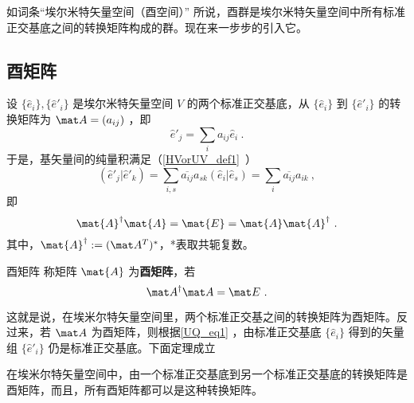 
如词条“埃尔米特矢量空间（酉空间）” 所说，酉群是埃尔米特矢量空间中所有标准正交基底之间的转换矩阵构成的群。现在来一步步的引入它。
\subsection{酉矩阵}
设 $\{ \hat e_i\},\{  \hat e'_i\}$ 是埃尔米特矢量空间 $V$ 的两个标准正交基底，从 $\{ \hat e_i\}$ 到 $\{\hat e'_i\}$ 的转换矩阵为 $\mat A=(a_{ij})$ ，即
\begin{equation}\label{UQ_eq1}
   \hat e'_j=\sum_{i}a_{ij} \hat e_i~.
\end{equation}
于是，基矢量间的纯量积满足（\autoref{HVorUV_def1}~）
\begin{equation}
( \hat e'_j| \hat e'_k)=\sum_{i,s}\overline{a_{ij}}a_{sk}(\hat e_i|\hat e_s)=\sum_{i}\overline{a_{ij}}a_{ik}~,
\end{equation}
即
\begin{equation}\label{UQ_eq2}
\mat{A}^\dagger \mat{A}=\mat{E}=\mat{A} \mat{A}^\dagger~.
\end{equation}
其中，$\mat{A}^\dagger:=(\mat A^T)^*$，*表取共轭复数。
\begin{definition}{酉矩阵}
称矩阵 $\mat{A}$ 为\textbf{酉矩阵}，若
\begin{equation}
\mat A^\dagger \mat A=\mat E~.
\end{equation}
\end{definition}
这就是说，在埃米尔特矢量空间里，两个标准正交基之间的转换矩阵为酉矩阵。反过来，若 $\mat A$ 为酉矩阵，则根据\autoref{UQ_eq1} ，由标准正交基底 $\{\hat e_i\}$ 得到的矢量组 $\{\hat e'_i\}$ 仍是标准正交基底。下面定理成立
\begin{theorem}{}
在埃米尔特矢量空间中，由一个标准正交基底到另一个标准正交基底的转换矩阵是酉矩阵，而且，所有酉矩阵都可以是这种转换矩阵。
\end{theorem}
